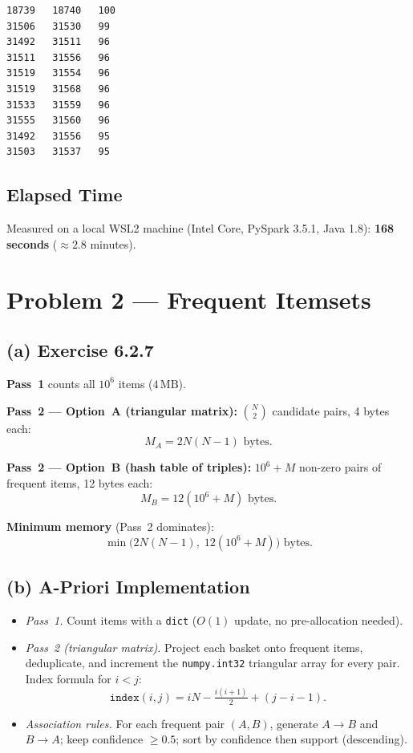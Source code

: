 \documentclass[11pt,a4paper]{article}
\begin{document}
\begin{lstlisting}
18739   18740   100
31506   31530   99
31492   31511   96
31511   31556   96
31519   31554   96
31519   31568   96
31533   31559   96
31555   31560   96
31492   31556   95
31503   31537   95
\end{lstlisting}

\subsection*{Elapsed Time}

Measured on a local WSL2 machine (Intel Core, PySpark 3.5.1, Java 1.8):
\textbf{168 seconds} ($\approx 2.8$ minutes).

\section{Problem 2 — Frequent Itemsets}

\subsection*{(a) Exercise 6.2.7}

\textbf{Pass~1} counts all $10^6$ items ($4\,\text{MB}$).

\textbf{Pass~2 — Option~A (triangular matrix):}
$\binom{N}{2}$ candidate pairs, 4 bytes each:
\[
  M_A = 2N(N-1) \text{ bytes.}
\]

\textbf{Pass~2 — Option~B (hash table of triples):}
$10^6 + M$ non-zero pairs of frequent items, 12 bytes each:
\[
  M_B = 12(10^6 + M) \text{ bytes.}
\]

\textbf{Minimum memory} (Pass~2 dominates):
\[
  \boxed{\min\!\bigl(2N(N-1),\; 12(10^6 + M)\bigr) \text{ bytes.}}
\]

\subsection*{(b) A-Priori Implementation}

\begin{itemize}
  \item \textit{Pass~1.} Count items with a \texttt{dict} ($O(1)$ update, no pre-allocation needed).

  \item \textit{Pass~2 (triangular matrix).} Project each basket onto frequent items,
        deduplicate, and increment the \texttt{numpy.int32} triangular array for every pair.
        Index formula for $i < j$:
        \[
          \texttt{index}(i,j) = i N - \tfrac{i(i+1)}{2} + (j - i - 1).
        \]

  \item \textit{Association rules.} For each frequent pair $(A,B)$, generate $A\!\to\!B$
        and $B\!\to\!A$; keep confidence $\ge 0.5$; sort by confidence then support (descending).
\end{itemize}
\end{document}
